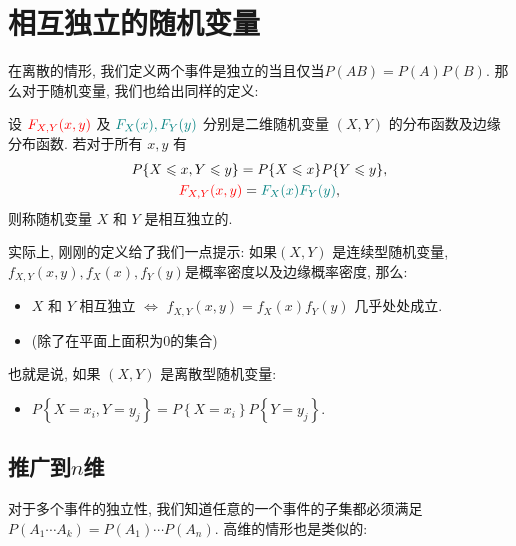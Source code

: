 \section{相互独立的随机变量}

在离散的情形, 我们定义两个事件是独立的当且仅当$P(AB)=P(A)P(B)$. 那么对于随机变量, 我们也给出同样的定义: 

\begin{definition}[相互独立的随机变量]
    设 ${{\color{red}F_{X,Y}(x, y)}}$ 及 ${{\color{teal}F_X(x), F_Y(y)}}$ 分别是二维随机变量 $(X, Y)$ 的分布函数及边缘分布函数. 若对于所有 $x, y$ 有
    $$
\begin{gathered}
    P\{X \leqslant x, Y \leqslant y\}=P\{X \leqslant x\} P\{Y \leqslant y\}, \\
{{\color{red}F_{X,Y}(x, y)}}={{\color{teal}F_X(x) F_Y(y)}},
\end{gathered}
$$
则称随机变量 $X$ 和 $Y$ 是相互独立的.
\end{definition}

实际上, 刚刚的定义给了我们一点提示: 如果$(X, Y)$ 是连续型随机变量,$f_{X,Y}(x, y), f_X(x), f_Y(y)$是概率密度以及边缘概率密度, 那么: 
\begin{itemize}
    \item $X$ 和 $Y$ 相互独立 $\iff$ $f_{X,Y}(x, y)=f_X(x) f_Y(y)$ 几乎处处成立. 
    \item (除了在平面上面积为0的集合)
\end{itemize}

也就是说, 如果 $(X, Y)$ 是离散型随机变量:
    \begin{itemize}
        \item $P\left\{X=x_i, Y=y_j\right\}=P\left\{X=x_i\right\} P\left\{Y=y_j\right\}$.
    \end{itemize}

\subsection{推广到$n$维}

对于多个事件的独立性, 我们知道任意的一个事件的子集都必须满足$P(A_1\cdots A_k)=P(A_1)\cdots P(A_n)$. 高维的情形也是类似的: 

